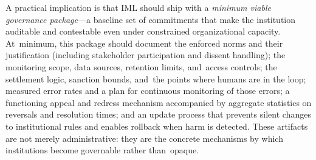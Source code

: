 \documentclass[mca,article,accept,pdftex,oneauthor]{Definitions/mdpi}
\begin{document}
\begin{table}[H]%
\small
\caption{Illustrative mapping from IML artifacts to governance functions. The~goal is not superficial compliance but operational hooks that make institutions inspectable and~revisable.}
\label{tab:rmfmap}

\end{table}

A practical implication is that IML should ship with a \emph{minimum viable governance package}---a baseline set of commitments that make the institution auditable and contestable even under constrained organizational capacity. At~minimum, this package should document the enforced norms and their justification (including stakeholder participation and dissent handling); the monitoring scope, data sources, retention limits, and~access controls; the settlement logic, sanction bounds, and~the points where humans are in the loop; measured error rates and a plan for continuous monitoring of those errors; a functioning appeal and redress mechanism accompanied by aggregate statistics on reversals and resolution times; and an update process that prevents silent changes to institutional rules and enables rollback when harm is detected. These artifacts are not merely administrative: they are the concrete mechanisms by which institutions become governable rather than~opaque.
\end{document}
